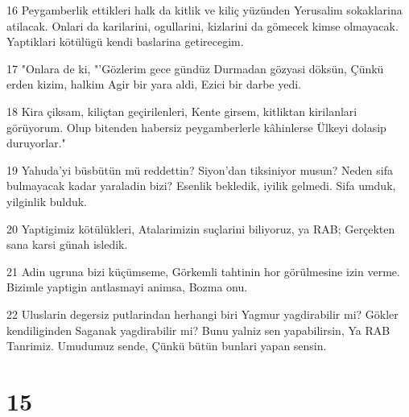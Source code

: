 \par 16 Peygamberlik ettikleri halk da kitlik ve kiliç yüzünden Yerusalim sokaklarina atilacak. Onlari da karilarini, ogullarini, kizlarini da gömecek kimse olmayacak. Yaptiklari kötülügü kendi baslarina getirecegim.
\par 17 "Onlara de ki, "'Gözlerim gece gündüz Durmadan gözyasi döksün, Çünkü erden kizim, halkim Agir bir yara aldi, Ezici bir darbe yedi.
\par 18 Kira çiksam, kiliçtan geçirilenleri, Kente girsem, kitliktan kirilanlari görüyorum. Olup bitenden habersiz peygamberlerle kâhinlerse Ülkeyi dolasip duruyorlar."
\par 19 Yahuda'yi büsbütün mü reddettin? Siyon'dan tiksiniyor musun? Neden sifa bulmayacak kadar yaraladin bizi? Esenlik bekledik, iyilik gelmedi. Sifa umduk, yilginlik bulduk.
\par 20 Yaptigimiz kötülükleri, Atalarimizin suçlarini biliyoruz, ya RAB; Gerçekten sana karsi günah isledik.
\par 21 Adin ugruna bizi küçümseme, Görkemli tahtinin hor görülmesine izin verme. Bizimle yaptigin antlasmayi animsa, Bozma onu.
\par 22 Uluslarin degersiz putlarindan herhangi biri Yagmur yagdirabilir mi? Gökler kendiliginden Saganak yagdirabilir mi? Bunu yalniz sen yapabilirsin, Ya RAB Tanrimiz. Umudumuz sende, Çünkü bütün bunlari yapan sensin.

\chapter{15}

